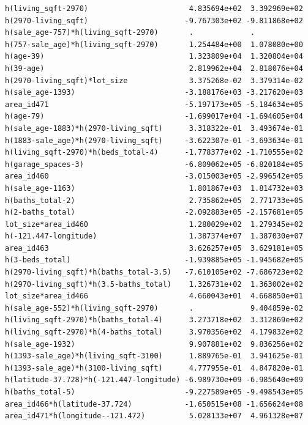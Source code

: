 \documentclass[
]{article}
\begin{document}
\begin{verbatim}
h(living_sqft-2970)                       4.835694e+02  3.392969e+02
h(2970-living_sqft)                      -9.767303e+02 -9.811868e+02
h(sale_age-757)*h(living_sqft-2970)       .             .           
h(757-sale_age)*h(living_sqft-2970)       1.254484e+00  1.078080e+00
h(age-39)                                 1.323809e+04  1.320804e+04
h(39-age)                                 2.819962e+04  2.818076e+04
h(2970-living_sqft)*lot_size              3.375268e-02  3.379314e-02
h(sale_age-1393)                         -3.188176e+03 -3.217620e+03
area_id471                               -5.197173e+05 -5.184634e+05
h(age-79)                                -1.699017e+04 -1.694605e+04
h(sale_age-1883)*h(2970-living_sqft)      3.318322e-01  3.493674e-01
h(1883-sale_age)*h(2970-living_sqft)     -3.622307e-01 -3.693634e-01
h(living_sqft-2970)*h(beds_total-4)      -1.778377e+02 -1.710555e+02
h(garage_spaces-3)                       -6.809062e+05 -6.820184e+05
area_id460                               -3.015003e+05 -2.996542e+05
h(sale_age-1163)                          1.801867e+03  1.814732e+03
h(baths_total-2)                          2.735862e+05  2.771733e+05
h(2-baths_total)                         -2.092883e+05 -2.157681e+05
lot_size*area_id460                       1.280029e+02  1.279345e+02
h(-121.447-longitude)                     1.387374e+07  1.387030e+07
area_id463                                3.626257e+05  3.629181e+05
h(3-beds_total)                          -1.939885e+05 -1.945682e+05
h(2970-living_sqft)*h(baths_total-3.5)   -7.610105e+02 -7.686723e+02
h(2970-living_sqft)*h(3.5-baths_total)    1.326731e+02  1.363002e+02
lot_size*area_id466                       4.660043e+01  4.668850e+01
h(sale_age-552)*h(living_sqft-2970)       .             9.404859e-02
h(living_sqft-2970)*h(baths_total-4)      3.273718e+02  3.312869e+02
h(living_sqft-2970)*h(4-baths_total)      3.970356e+02  4.179832e+02
h(sale_age-1932)                          9.907881e+02  9.836256e+02
h(1393-sale_age)*h(living_sqft-3100)      1.889765e-01  3.941625e-01
h(1393-sale_age)*h(3100-living_sqft)      4.777955e-01  4.847820e-01
h(latitude-37.728)*h(-121.447-longitude) -6.989730e+09 -6.985640e+09
h(baths_total-5)                         -9.227589e+05 -9.498543e+05
area_id466*h(latitude-37.724)            -1.650515e+08 -1.656624e+08
area_id471*h(longitude--121.472)          5.028133e+07  4.961328e+07
                                                                    

\end{verbatim}
\end{document}
